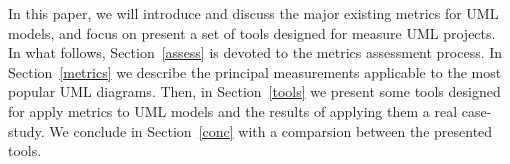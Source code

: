 In this paper, we will introduce and discuss the major existing metrics for UML models, and focus on present a set of tools designed for measure UML projects.
In what follows, Section~\ref{assess} is devoted to the metrics assessment process.
In Section~\ref{metrics} we describe the principal measurements applicable to the most popular UML diagrams.
Then, in Section~\ref{tools} we present some tools designed for apply metrics to UML models and the results of applying them a real case-study.
We conclude in Section~\ref{conc} with a comparsion between the presented tools.
  
    


